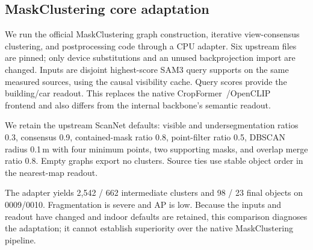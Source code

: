 \subsection{MaskClustering core adaptation}\label{app:external}
We run the official MaskClustering graph construction, iterative view-consensus clustering, and postprocessing code through a CPU adapter. Six upstream files are pinned; only device substitutions and an unused backprojection import are changed. Inputs are disjoint highest-score SAM3 query supports on the same measured sources, using the causal visibility cache. Query scores provide the building/car readout. This replaces the native CropFormer~\cite{cropformer}/OpenCLIP~\cite{openclip} frontend and also differs from the internal backbone's semantic readout.

We retain the upstream ScanNet defaults: visible and undersegmentation ratios 0.3, consensus 0.9, contained-mask ratio 0.8, point-filter ratio 0.5, DBSCAN radius 0.1\,m with four minimum points, two supporting masks, and overlap merge ratio 0.8. Empty graphs export no clusters. Source ties use stable object order in the nearest-map readout.

\begin{center}\small

\end{center}

The adapter yields 2,542 / 662 intermediate clusters and 98 / 23 final objects on 0009/0010. Fragmentation is severe and AP is low. Because the inputs and readout have changed and indoor defaults are retained, this comparison diagnoses the adaptation; it cannot establish superiority over the native MaskClustering pipeline.
